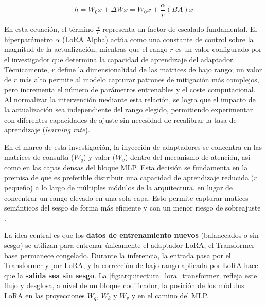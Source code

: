 \documentclass[12pt,a4paper]{report}
\begin{document}
\begin{equation}
h = W_0x + \Delta Wx = W_0x + \frac{\alpha}{r}(BA)x
\end{equation}

En esta ecuación, el término $\frac{\alpha}{r}$ representa un factor de escalado fundamental. El hiperparámetro $\alpha$ (LoRA Alpha) actúa como una constante de control sobre la magnitud de la actualización, mientras que el rango $r$ es un valor configurado por el investigador que determina la capacidad de aprendizaje del adaptador. Técnicamente, $r$ define la dimensionalidad de las matrices de bajo rango; un valor de $r$ más alto permite al modelo capturar patrones de mitigación más complejos, pero incrementa el número de parámetros entrenables y el coste computacional. Al normalizar la intervención mediante esta relación, se logra que el impacto de la actualización sea independiente del rango elegido, permitiendo experimentar con diferentes capacidades de ajuste sin necesidad de recalibrar la tasa de aprendizaje (\textit{learning rate}).

En el marco de esta investigación, la inyección de adaptadores se concentra en las matrices de consulta ($W_q$) y valor ($W_v$) dentro del mecanismo de atención, así como en las capas densas del bloque MLP. Esta decisión se fundamenta en la premisa de que es preferible distribuir una capacidad de aprendizaje reducida ($r$ pequeño) a lo largo de múltiples módulos de la arquitectura, en lugar de concentrar un rango elevado en una sola capa. Esto permite capturar matices semánticos del sesgo de forma más eficiente y con un menor riesgo de sobreajuste \cite{hu_lora_2021}.

La idea central es que los \textbf{datos de entrenamiento nuevos} (balanceados o sin sesgo) se utilizan para entrenar únicamente el adaptador LoRA; el Transformer 
base permanece congelado. Durante la inferencia, la entrada pasa por el Transformer y por LoRA, y la corrección de bajo rango aplicada por LoRA hace que la 
\textbf{salida sea sin sesgo}. La \autoref{fig:arquitectura_lora_transformer} refleja este flujo y desglosa, a nivel de un bloque codificador, la posición de los módulos LoRA en las proyecciones $W_q$, $W_k$ y $W_v$ y en el camino del MLP.
\end{document}
